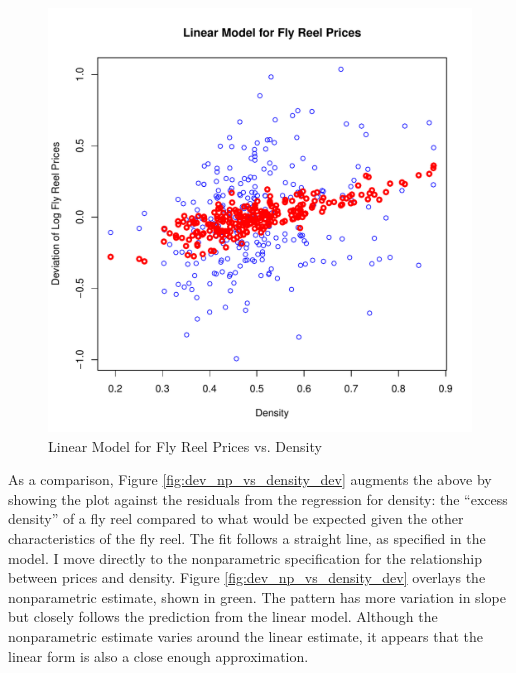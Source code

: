 \documentclass[11pt]{paper}
\begin{document}
\begin{figure}[h!]
  \centering
  \includegraphics[scale = 0.5, keepaspectratio=true]{../Figures/dev_vs_density}
  \caption{Linear Model for Fly Reel Prices vs. Density} \label{fig:dev_vs_density}
\end{figure}



\pagebreak
As a comparison, Figure \ref{fig:dev_np_vs_density_dev} 
augments the above by showing the plot against the 
residuals from the regression for 
density:
the ``excess density'' of a fly reel 
compared to what would be 
expected given the other characteristics of the fly reel. 
The fit follows a straight line, as specified in the model. 
% 
I move directly to the nonparametric specification for 
the relationship between prices and 
density.
Figure \ref{fig:dev_np_vs_density_dev} 
overlays the nonparametric estimate, shown in green. 
The pattern has more variation in slope but 
closely follows the prediction from the linear model. 
Although the nonparametric estimate varies around the linear estimate,
it appears that the linear form
is also a close enough approximation.
\end{document}

